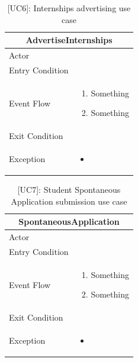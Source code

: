 \begin{table}[H]
    \centering
    \begin{tabular}{|p{3cm}|p{12cm}|}
    \hline
    \multicolumn{2}{|c|}{\textbf{AdvertiseInternships}} \\ \hline
    Actor & \\ \hline
    Entry Condition & \\ \hline
    Event Flow &
    \begin{enumerate}         
        \item Something
        \item Something
    \end{enumerate} \\ \hline
    Exit Condition & \\ \hline
    Exception & 
    \begin{itemize}        
        \item
    \end{itemize} \\ \hline
    \end{tabular}
    \caption{[UC6]: Internships advertising use case}
    \label{tab:UC6}
\end{table}

\begin{table}[H]
    \centering
    \begin{tabular}{|p{3cm}|p{12cm}|}
    \hline
    \multicolumn{2}{|c|}{\textbf{SpontaneousApplication}} \\ \hline
    Actor & \\ \hline
    Entry Condition & \\ \hline
    Event Flow &
    \begin{enumerate}         
        \item Something
        \item Something
    \end{enumerate} \\ \hline
    Exit Condition & \\ \hline
    Exception & 
    \begin{itemize}       
        \item     
    \end{itemize} \\ \hline
    \end{tabular}
    \caption{[UC7]: Student Spontaneous Application submission use case}
    \label{tab:UC7}
\end{table}

